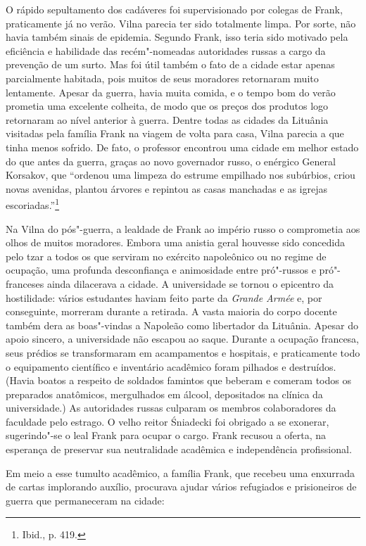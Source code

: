 O rápido sepultamento dos cadáveres foi supervisionado por colegas de
Frank, praticamente já no verão. Vilna parecia ter sido totalmente
limpa. Por sorte, não havia também sinais de epidemia. Segundo Frank,
isso teria sido motivado pela eficiência e habilidade das recém"-nomeadas
autoridades russas a cargo da prevenção de um surto. Mas foi útil também
o fato de a cidade estar apenas parcialmente habitada, pois muitos de
seus moradores retornaram muito lentamente. Apesar da guerra, havia
muita comida, e o tempo bom do verão prometia uma excelente colheita, de
modo que os preços dos produtos logo retornaram ao nível anterior à
guerra. Dentre todas as cidades da Lituânia visitadas pela família Frank
na viagem de volta para casa, Vilna parecia a que tinha menos sofrido.
De fato, o professor encontrou uma cidade em melhor estado do que antes
da guerra, graças ao novo governador russo, o enérgico General Korsakov,
que ``ordenou uma limpeza do estrume empilhado nos subúrbios, criou
novas avenidas, plantou árvores e repintou as casas manchadas e as
igrejas escoriadas.''\footnote{Ibid., p. 419.}

Na Vilna do pós"-guerra, a lealdade de Frank ao império russo o
comprometia aos olhos de muitos moradores. Embora uma anistia geral
houvesse sido concedida pelo tzar a todos os que serviram no exército
napoleônico ou no regime de ocupação, uma profunda desconfiança e
animosidade entre pró"-russos e pró"-franceses ainda dilacerava a cidade.
A universidade se tornou o epicentro da hostilidade: vários estudantes
haviam feito parte da \emph{Grande Armée} e, por conseguinte, morreram
durante a retirada. A vasta maioria do corpo docente também dera as
boas"-vindas a Napoleão como libertador da Lituânia. Apesar do apoio
sincero, a universidade não escapou ao saque. Durante a ocupação
francesa, seus prédios se transformaram em acampamentos e hospitais, e
praticamente todo o equipamento científico e inventário acadêmico foram
pilhados e destruídos. (Havia boatos a respeito de soldados famintos que
beberam e comeram todos os preparados anatômicos, mergulhados em álcool,
depositados na clínica da universidade.) As autoridades russas culparam
os membros colaboradores da faculdade pelo estrago. O velho reitor
Śniadecki foi obrigado a se exonerar, sugerindo"-se o leal Frank para
ocupar o cargo. Frank recusou a oferta, na esperança de preservar sua
neutralidade acadêmica e independência profissional.

Em meio a esse tumulto acadêmico, a família Frank, que recebeu uma
enxurrada de cartas implorando auxílio, procurava ajudar vários
refugiados e prisioneiros de guerra que permaneceram na cidade:

